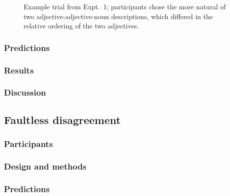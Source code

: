 \documentclass[11pt]{article}
\begin{document}
\begin{figure}[h!]
\centering
	\caption{Example trial from Expt.~1; participants chose the more natural of two adjective-adjective-noun descriptions, which differed in the relative ordering of the two adjectives.}\label{order-trial}
\end{figure}

\subsubsection{Predictions}

\subsubsection{Results}

\subsubsection{Discussion}


\subsection{Faultless disagreement}

\subsubsection{Participants}

\subsubsection{Design and methods}

\subsubsection{Predictions}
\end{document}
